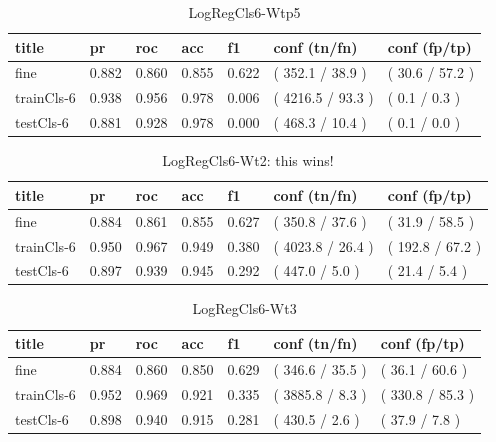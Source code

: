 \documentclass[ms]{nuthesis}
\begin{document}
\FloatBarrier
\begin{table}[H]
\centering
\begin{tabular}{|l||l||l||l||l||l||l|}\toprule
title & pr & roc & acc & f1 & conf (tn/fn) & conf (fp/tp) \\ \midrule
fine & 0.882 & 0.860 & 0.855 & 0.622 & ( 352.1 / 38.9 ) & ( 30.6 / 57.2 ) \\
trainCls-6 & 0.938 & 0.956 & 0.978 & 0.006 & ( 4216.5 / 93.3 ) & ( 0.1 / 0.3 ) \\
testCls-6 & 0.881 & 0.928 & 0.978 & 0.000 & ( 468.3 / 10.4 ) & ( 0.1 / 0.0 ) \\ \bottomrule
\end{tabular}
\caption{LogRegCls6-Wtp5}
\label{tab:LogRegCls6-Wtp5}
\end{table}
\FloatBarrier


\FloatBarrier
\begin{table}[H]
\centering
\begin{tabular}{|l||l||l||l||l||l||l|}\toprule
title & pr & roc & acc & f1 & conf (tn/fn) & conf (fp/tp) \\ \midrule
fine & 0.884 & 0.861 & 0.855 & 0.627 & ( 350.8 / 37.6 ) & ( 31.9 / 58.5 ) \\
trainCls-6 & 0.950 & 0.967 & 0.949 & 0.380 & ( 4023.8 / 26.4 ) & ( 192.8 / 67.2 ) \\
testCls-6 & 0.897 & 0.939 & 0.945 & 0.292 & ( 447.0 / 5.0 ) & ( 21.4 / 5.4 ) \\ \bottomrule
\end{tabular}
\caption{LogRegCls6-Wt2: this wins!}
\label{tab:LogRegCls6-Wt2}
\end{table}
\FloatBarrier

\FloatBarrier
\begin{table}[H]
\centering
\begin{tabular}{|l||l||l||l||l||l||l|}\toprule
title & pr & roc & acc & f1 & conf (tn/fn) & conf (fp/tp) \\ \midrule
fine & 0.884 & 0.860 & 0.850 & 0.629 & ( 346.6 / 35.5 ) & ( 36.1 / 60.6 ) \\
trainCls-6 & 0.952 & 0.969 & 0.921 & 0.335 & ( 3885.8 / 8.3 ) & ( 330.8 / 85.3 ) \\
testCls-6 & 0.898 & 0.940 & 0.915 & 0.281 & ( 430.5 / 2.6 ) & ( 37.9 / 7.8 ) \\ \bottomrule
\end{tabular}
\caption{LogRegCls6-Wt3}
\label{tab:LogRegCls6-Wt3}
\end{table}
\FloatBarrier
\end{document}

